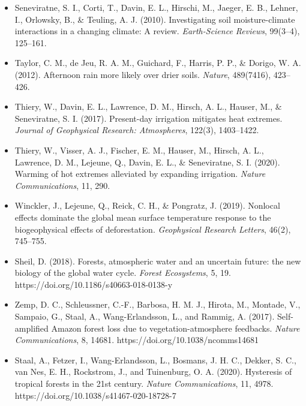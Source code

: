 \begin{itemize}
\item Seneviratne, S. I., Corti, T., Davin, E. L., Hirschi, M., Jaeger, E. B., Lehner, I., Orlowsky, B., \& Teuling, A. J. (2010). Investigating soil moisture-climate interactions in a changing climate: A review. \textit{Earth-Science Reviews}, 99(3--4), 125--161.
\item Taylor, C. M., de Jeu, R. A. M., Guichard, F., Harris, P. P., \& Dorigo, W. A. (2012). Afternoon rain more likely over drier soils. \textit{Nature}, 489(7416), 423--426.
\item Thiery, W., Davin, E. L., Lawrence, D. M., Hirsch, A. L., Hauser, M., \& Seneviratne, S. I. (2017). Present-day irrigation mitigates heat extremes. \textit{Journal of Geophysical Research: Atmospheres}, 122(3), 1403--1422.
\item Thiery, W., Visser, A. J., Fischer, E. M., Hauser, M., Hirsch, A. L., Lawrence, D. M., Lejeune, Q., Davin, E. L., \& Seneviratne, S. I. (2020). Warming of hot extremes alleviated by expanding irrigation. \textit{Nature Communications}, 11, 290.
\item Winckler, J., Lejeune, Q., Reick, C. H., \& Pongratz, J. (2019). Nonlocal effects dominate the global mean surface temperature response to the biogeophysical effects of deforestation. \textit{Geophysical Research Letters}, 46(2), 745--755.
\end{itemize}

\begin{itemize}
\item Sheil, D. (2018). Forests, atmospheric water and an uncertain future: the new biology of the global water cycle. \textit{Forest Ecosystems}, 5, 19. https://doi.org/10.1186/s40663-018-0138-y

\item Zemp, D. C., Schleussner, C.-F., Barbosa, H. M. J., Hirota, M., Montade, V., Sampaio, G., Staal, A., Wang-Erlandsson, L., and Rammig, A. (2017). Self-amplified Amazon forest loss due to vegetation-atmosphere feedbacks. \textit{Nature Communications}, 8, 14681. https://doi.org/10.1038/ncomms14681

\item Staal, A., Fetzer, I., Wang-Erlandsson, L., Bosmans, J. H. C., Dekker, S. C., van Nes, E. H., Rockstrom, J., and Tuinenburg, O. A. (2020). Hysteresis of tropical forests in the 21st century. \textit{Nature Communications}, 11, 4978. https://doi.org/10.1038/s41467-020-18728-7

\end{itemize}
